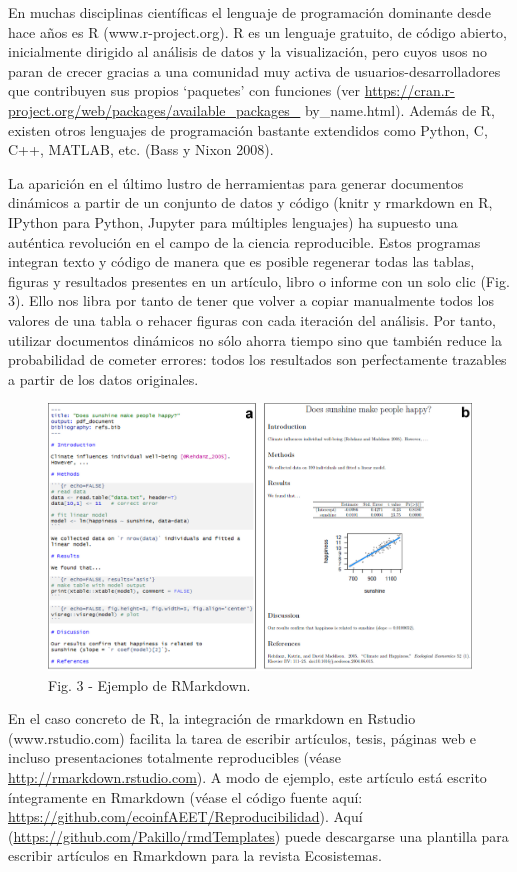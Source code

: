 \documentclass[]{tufte-handout}
\begin{document}
En muchas disciplinas científicas el lenguaje de programación dominante
desde hace años es R (www.r-project.org). R es un lenguaje gratuito, de
código abierto, inicialmente dirigido al análisis de datos y la
visualización, pero cuyos usos no paran de crecer gracias a una
comunidad muy activa de usuarios-desarrolladores que contribuyen sus
propios `paquetes' con funciones (ver
\url{https://cran.r-project.org/web/packages/available_packages_}
by\_name.html). Además de R, existen otros lenguajes de programación
bastante extendidos como Python, C, C++, MATLAB, etc. (Bass y Nixon
2008).

La aparición en el último lustro de herramientas para generar documentos
dinámicos a partir de un conjunto de datos y código (knitr y rmarkdown
en R, IPython para Python, Jupyter para múltiples lenguajes) ha supuesto
una auténtica revolución en el campo de la ciencia reproducible. Estos
programas integran texto y código de manera que es posible regenerar
todas las tablas, figuras y resultados presentes en un artículo, libro o
informe con un solo clic (Fig. 3). Ello nos libra por tanto de tener que
volver a copiar manualmente todos los valores de una tabla o rehacer
figuras con cada iteración del análisis. Por tanto, utilizar documentos
dinámicos no sólo ahorra tiempo sino que también reduce la probabilidad
de cometer errores: todos los resultados son perfectamente trazables a
partir de los datos originales.

\begin{figure}
\includegraphics[width=1\linewidth]{images/fig_-002} \caption[Fig]{Fig. 3 - Ejemplo de RMarkdown.}\label{fig:unnamed-chunk-3}
\end{figure}

En el caso concreto de R, la integración de rmarkdown en Rstudio
(www.rstudio.com) facilita la tarea de escribir artículos, tesis,
páginas web e incluso presentaciones totalmente reproducibles (véase
\url{http://rmarkdown.rstudio.com}). A modo de ejemplo, este artículo
está escrito íntegramente en Rmarkdown (véase el código fuente aquí:
\url{https://github.com/ecoinfAEET/Reproducibilidad}). Aquí
(\url{https://github.com/Pakillo/rmdTemplates}) puede descargarse una
plantilla para escribir artículos en Rmarkdown para la revista
Ecosistemas.
\end{document}
